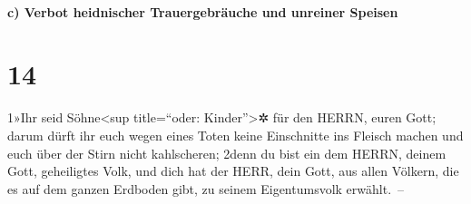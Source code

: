 \hypertarget{c-verbot-heidnischer-trauergebruxe4uche-und-unreiner-speisen}{%
\paragraph{c) Verbot heidnischer Trauergebräuche und unreiner
Speisen}\label{c-verbot-heidnischer-trauergebruxe4uche-und-unreiner-speisen}}

\hypertarget{section-13}{%
\section{14}\label{section-13}}

1»Ihr seid Söhne\textless sup title=``oder: Kinder''\textgreater✲ für
den HERRN, euren Gott; darum dürft ihr euch wegen eines Toten keine
Einschnitte ins Fleisch machen und euch über der Stirn nicht
kahlscheren; 2denn du bist ein dem HERRN, deinem Gott, geheiligtes Volk,
und dich hat der HERR, dein Gott, aus allen Völkern, die es auf dem
ganzen Erdboden gibt, zu seinem Eigentumsvolk erwählt.~--

